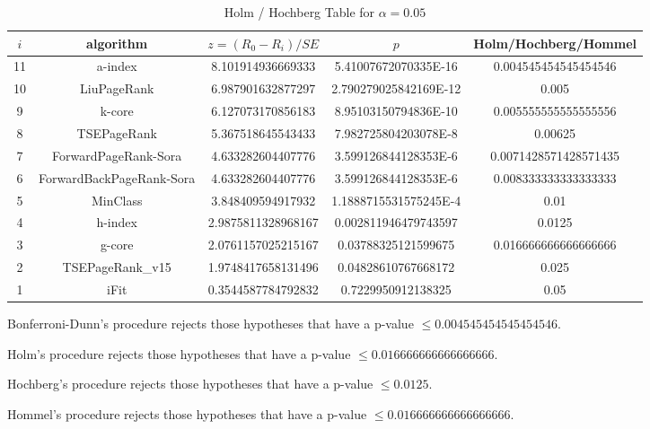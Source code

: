 \documentclass[a4paper,10pt]{article}
\begin{document}
\begin{landscape}
\begin{table}[!htp]
\centering\tiny
\caption{Holm / Hochberg Table for $\alpha=0.05$}
\begin{tabular}{ccccc}
$i$&algorithm&$z=(R_0 - R_i)/SE$&$p$&Holm/Hochberg/Hommel\\
\hline
11&a-index&8.101914936669333&5.41007672070335E-16&0.004545454545454546\\
10&LiuPageRank&6.987901632877297&2.790279025842169E-12&0.005\\
9&k-core&6.127073170856183&8.95103150794836E-10&0.005555555555555556\\
8&TSEPageRank&5.367518645543433&7.982725804203078E-8&0.00625\\
7&ForwardPageRank-Sora&4.633282604407776&3.599126844128353E-6&0.0071428571428571435\\
6&ForwardBackPageRank-Sora&4.633282604407776&3.599126844128353E-6&0.008333333333333333\\
5&MinClass&3.848409594917932&1.1888715531575245E-4&0.01\\
4&h-index&2.9875811328968167&0.002811946479743597&0.0125\\
3&g-core&2.0761157025215167&0.03788325121599675&0.016666666666666666\\
2&TSEPageRank_v15&1.9748417658131496&0.04828610767668172&0.025\\
1&iFit&0.3544587784792832&0.7229950912138325&0.05\\
\hline
\end{tabular}
\end{table}
Bonferroni-Dunn's procedure rejects those hypotheses that have a p-value $\le0.004545454545454546$.


Holm's procedure rejects those hypotheses that have a p-value $\le0.016666666666666666$.


Hochberg's procedure rejects those hypotheses that have a p-value $\le0.0125$.


Hommel's procedure rejects those hypotheses that have a p-value $\le0.016666666666666666$.



\end{landscape}
\end{document}
